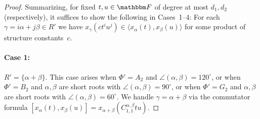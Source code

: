 \documentclass[10pt,a4paper]{article}
\theoremstyle{definition}
\newcommand{\F}{\mathbbm F}
\begin{document}
\begin{proof}
    Summarizing, for fixed $t, u \in \F$ of degree at most $d_1, d_2$ (respectively), it suffices to show the following in Cases~1--4: For each  $\gamma = i\alpha + j\beta \in R'$ we have $x_\gamma(c t^iu^j) \in \langle x_{\alpha}(t), x_{\beta}(u) \rangle$ for some product of structure constants~$c$.
    
    \paragraph{Case 1:} $R' = \{\alpha+\beta\}$. This case arises when $\Phi' = A_2$ and $\angle(\alpha,\beta) = 120^\circ$, or when $\Phi' = B_2$ and $\alpha,\beta$ are short roots with $\angle(\alpha,\beta) = 90^\circ$, or when $\Phi' = G_2$ and $\alpha,\beta$ are short roots with $\angle(\alpha,\beta) = 60^\circ$.  We handle $\gamma = \alpha + \beta$ via the commutator formula
    $
        [x_\alpha(t),x_\beta(u)] = x_{\alpha+\beta}(C_{1,1}^{\alpha,\beta}tu).
    $
    

\end{proof}
\end{document}
